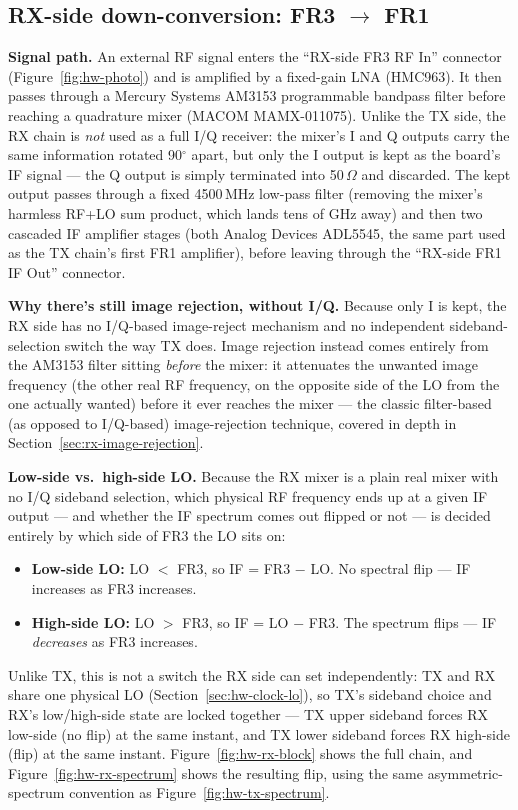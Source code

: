 \subsection{RX-side down-conversion: FR3 $\to$ FR1}
\label{sec:hw-rx}

\textbf{Signal path.} An external RF signal enters the ``RX-side FR3 RF In'' connector (Figure~\ref{fig:hw-photo})
and is amplified by a fixed-gain LNA (HMC963). It then passes through a Mercury
Systems AM3153 programmable bandpass filter before
reaching a quadrature mixer (MACOM MAMX-011075). Unlike the TX side, the RX chain is \emph{not} used as a full I/Q receiver: the mixer's I and Q outputs
carry the same information rotated 90$^\circ$ apart, but only the I output is kept as the board's IF signal ---
the Q output is simply terminated into 50$\,\Omega$ and discarded. The kept output passes through a fixed
4500\,MHz low-pass filter (removing the mixer's harmless RF+LO sum product, which lands tens of GHz away) and
then two cascaded IF amplifier stages (both Analog Devices ADL5545, the same part used as the TX chain's first
FR1 amplifier), before leaving through the ``RX-side FR1 IF Out'' connector.

\textbf{Why there's still image rejection, without I/Q.} Because only I is kept, the RX side has no I/Q-based
image-reject mechanism and no independent sideband-selection switch the way TX does. Image rejection instead
comes entirely from the AM3153 filter sitting \emph{before} the mixer: it attenuates the unwanted image
frequency (the other real RF frequency, on the opposite side of the LO from the one actually wanted) before it
ever reaches the mixer --- the classic filter-based (as opposed to I/Q-based) image-rejection technique,
covered in depth in Section~\ref{sec:rx-image-rejection}.

\textbf{Low-side vs.\ high-side LO.} Because the RX mixer is a plain real mixer with no I/Q sideband selection,
which physical RF frequency ends up at a given IF output --- and whether the IF spectrum comes out flipped or
not --- is decided entirely by which side of FR3 the LO sits on:
{\setlength{\topsep}{0.2em}\setlength{\partopsep}{0pt}\begin{itemize}\setlength{\itemsep}{0.3em}\setlength{\parskip}{0pt}
\item \textbf{Low-side LO:} LO $<$ FR3, so IF = FR3 $-$ LO. No spectral flip --- IF increases as FR3 increases.
\item \textbf{High-side LO:} LO $>$ FR3, so IF = LO $-$ FR3. The spectrum flips --- IF \emph{decreases} as FR3
increases.
\end{itemize}}
Unlike TX, this is not a switch the RX side can set independently: TX and RX share one physical LO
(Section~\ref{sec:hw-clock-lo}), so TX's sideband choice and RX's low/high-side state are locked together ---
TX upper sideband forces RX low-side (no flip) at the same instant, and TX lower sideband forces RX high-side
(flip) at the same instant. Figure~\ref{fig:hw-rx-block}
shows the full chain, and Figure~\ref{fig:hw-rx-spectrum} shows the resulting flip, using the same asymmetric-spectrum
convention as Figure~\ref{fig:hw-tx-spectrum}.

